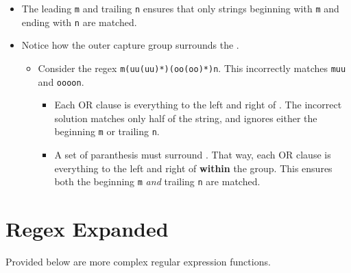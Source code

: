\documentclass[
  letterpaper,
  DIV=11,
  numbers=noendperiod]{scrreprt}
\providecommand{\tightlist}{%
  \setlength{\itemsep}{0pt}\setlength{\parskip}{0pt}}\usepackage{longtable,booktabs,array}
\begin{document}
\begin{itemize}
\tightlist
\item
  The leading \texttt{m} and trailing \texttt{n} ensures that only
  strings beginning with \texttt{m} and ending with \texttt{n} are
  matched.
\item
  Notice how the outer capture group surrounds the \texttt{\textbar{}}.

  \begin{itemize}
  \tightlist
  \item
    Consider the regex \texttt{m(uu(uu)*)\textbar{}(oo(oo)*)n}. This
    incorrectly matches \texttt{muu} and \texttt{oooon}.

    \begin{itemize}
    \tightlist
    \item
      Each OR clause is everything to the left and right of
      \texttt{\textbar{}}. The incorrect solution matches only half of
      the string, and ignores either the beginning \texttt{m} or
      trailing \texttt{n}.
    \item
      A set of paranthesis must surround \texttt{\textbar{}}. That way,
      each OR clause is everything to the left and right of
      \texttt{\textbar{}} \textbf{within} the group. This ensures both
      the beginning \texttt{m} \emph{and} trailing \texttt{n} are
      matched.
    \end{itemize}
  \end{itemize}
\end{itemize}

\hypertarget{regex-expanded}{%
\section{Regex Expanded}\label{regex-expanded}}

Provided below are more complex regular expression functions.
\end{document}
